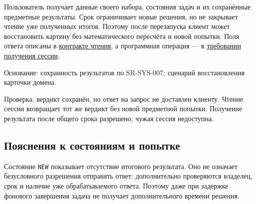 \documentclass[12pt,a4paper]{article}
\begin{document}
Пользователь получает данные своего набора, состояния задач и их сохранённые предметные результаты. Срок ограничивает новые решения, но не закрывает чтение уже полученных итогов. Поэтому после перезапуска клиент может восстановить картину без математического пересчёта и новой попытки. Поля ответа описаны в \href{../07_\%D0\%9F\%D1\%80\%D0\%BE\%D0\%B3\%D1\%80\%D0\%B0\%D0\%BC\%D0\%BC\%D0\%BD\%D1\%8B\%D0\%B5_\%D1\%82\%D1\%80\%D0\%B5\%D0\%B1\%D0\%BE\%D0\%B2\%D0\%B0\%D0\%BD\%D0\%B8\%D1\%8F/DOC-06.2_\%D0\%A1\%D0\%B5\%D1\%81\%D1\%81\%D0\%B8\%D0\%B8_\%D0\%B7\%D0\%B0\%D0\%B4\%D0\%B0\%D1\%87_\%D0\%B8_\%D0\%BF\%D0\%BB\%D0\%B0\%D0\%BD\%D0\%B8\%D1\%80\%D0\%BE\%D0\%B2\%D1\%89\%D0\%B8\%D0\%BA.pdf\#nameddest=\%D1\%87\%D1\%82\%D0\%B5\%D0\%BD\%D0\%B8\%D0\%B5-\%D0\%BF\%D0\%BE\%D1\%81\%D0\%BB\%D0\%B5-\%D0\%BF\%D0\%BE\%D1\%82\%D0\%B5\%D1\%80\%D0\%B8-\%D0\%BE\%D1\%82\%D0\%B2\%D0\%B5\%D1\%82\%D0\%B0}{контракте чтения}, а программная операция --- в \href{../07_\%D0\%9F\%D1\%80\%D0\%BE\%D0\%B3\%D1\%80\%D0\%B0\%D0\%BC\%D0\%BC\%D0\%BD\%D1\%8B\%D0\%B5_\%D1\%82\%D1\%80\%D0\%B5\%D0\%B1\%D0\%BE\%D0\%B2\%D0\%B0\%D0\%BD\%D0\%B8\%D1\%8F/DOC-06.2_\%D0\%A1\%D0\%B5\%D1\%81\%D1\%81\%D0\%B8\%D0\%B8_\%D0\%B7\%D0\%B0\%D0\%B4\%D0\%B0\%D1\%87_\%D0\%B8_\%D0\%BF\%D0\%BB\%D0\%B0\%D0\%BD\%D0\%B8\%D1\%80\%D0\%BE\%D0\%B2\%D1\%89\%D0\%B8\%D0\%BA.pdf\#nameddest=swr-ses-023-\%D1\%87\%D1\%82\%D0\%B5\%D0\%BD\%D0\%B8\%D0\%B5-\%D1\%81\%D0\%B5\%D1\%81\%D1\%81\%D0\%B8\%D0\%B8-\%D0\%B8-\%D1\%80\%D0\%B5\%D0\%B7\%D1\%83\%D0\%BB\%D1\%8C\%D1\%82\%D0\%B0\%D1\%82\%D0\%B0}{требовании получения сессии}.

Основание: сохранность результатов по SR-SYS-007; сценарий восстановления карточки домена.

Проверка: вердикт сохранён, но ответ на запрос не доставлен клиенту. Чтение сессии возвращает тот же вердикт без новой предметной попытки. Получение результата после общего срока разрешено; чужая сессия недоступна.

\subsection{Пояснения к состояниям и попытке}\label{ux43fux43eux44fux441ux43dux435ux43dux438ux44f-ux43a-ux441ux43eux441ux442ux43eux44fux43dux438ux44fux43c-ux438-ux43fux43eux43fux44bux442ux43aux435}

\hypertarget{пояснения-к-состояниям-и-попытке}{}

Состояние \texttt{NEW} показывает отсутствие итогового результата. Оно не означает безусловного разрешения отправить ответ: дополнительно проверяются владелец, срок и наличие уже обрабатываемого ответа. Поэтому даже при задержке фонового завершения задача не получает дополнительного времени решения.
\end{document}
